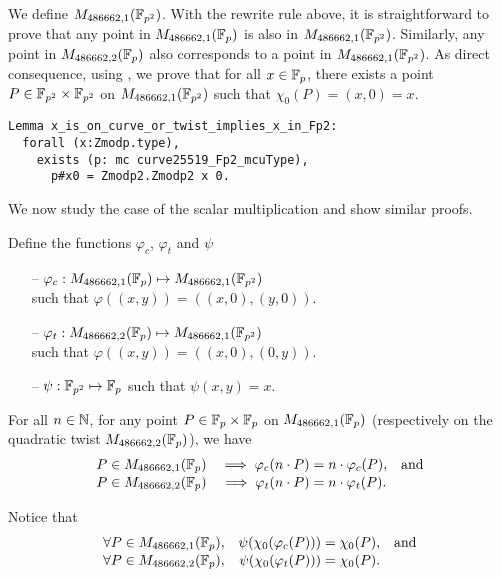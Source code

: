 We define $M_{486662,1}(\mathbb{F}_{p^2})$. With the rewrite rule above, it is straightforward
to prove that any point in $M_{486662,1}(\mathbb{F}_{p})$ is also in
$M_{486662,1}(\mathbb{F}_{p^2})$. Similarly, any point in
$M_{486662,2}(\mathbb{F}_{p})$ also corresponds to a point in $M_{486662,1}(\mathbb{F}_{p^2})$.
As direct consequence, using , we prove that for all
$x \in \mathbb{F}_{p}$, there exists a point $P \in \mathbb{F}_{p^2}\times\mathbb{F}_{p^2}$ on
$M_{486662,1}(\mathbb{F}_{p^2})$ such that $\chi_0(P) = (x,0) = x$.

\begin{lstlisting}[language=Coq,belowskip=-0.25 \baselineskip]
Lemma x_is_on_curve_or_twist_implies_x_in_Fp2:
  forall (x:Zmodp.type),
    exists (p: mc curve25519_Fp2_mcuType),
      p#x0 = Zmodp2.Zmodp2 x 0.
\end{lstlisting}

We now study the case of the scalar multiplication and show similar proofs.
\begin{dfn}
  Define the functions $\varphi_c$, $\varphi_t$ and $\psi$
  \begin{itemize}
    \item[--] $\varphi_c: M_{486662,1}(\mathbb{F}_{p}) \mapsto M_{486662,1}(\mathbb{F}_{p^2})$\\
          such that $\varphi((x,y)) = ((x,0), (y,0))$.
    \item[--] $\varphi_t: M_{486662,2}(\mathbb{F}_{p}) \mapsto M_{486662,1}(\mathbb{F}_{p^2})$\\
          such that $\varphi((x,y)) = ((x,0), (0,y))$.
    \item[--] $\psi: \mathbb{F}_{p^2} \mapsto \mathbb{F}_{p}$ such that $\psi(x,y) = x$.
  \end{itemize}
\end{dfn}

\begin{lemma}
  \label{lemma:proj}
  For all $n \in \mathbb{N}$, for any point $P\in\mathbb{F}_{p}\times\mathbb{F}_{p}$ on
  $M_{486662,1}(\mathbb{F}_{p})$ (respectively on the quadratic twist $M_{486662,2}(\mathbb{F}_{p})$), we have
  \vspace{-0.3em}
  \begin{align*}
    P & \in M_{486662,1}(\mathbb{F}_{p}) & \implies \varphi_c(n \cdot P) & = n \cdot \varphi_c(P), &  & \text{and} \\[-0.5ex]
    P & \in M_{486662,2}(\mathbb{F}_{p}) & \implies \varphi_t(n \cdot P) & = n \cdot \varphi_t(P).
  \end{align*}
\end{lemma}
Notice that
\vspace{-0.5em}
\begin{align*}
  \forall P \in M_{486662,1}(\mathbb{F}_{p}), &  & \psi(\chi_0(\varphi_c(P))) & = \chi_0(P), &  & \text{and} \\[-0.5ex]
  \forall P \in M_{486662,2}(\mathbb{F}_{p}), &  & \psi(\chi_0(\varphi_t(P))) & = \chi_0(P).
\end{align*}

